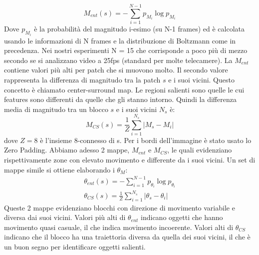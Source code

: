 \documentclass[12pt,twocolumn]{IEEEtran}
\begin{document}
			\begin{equation}
			M_{ent}(s) = -\sum_{i=1}^{N-1}p_{M_i}\log p_{M_i}
			\end{equation}
			Dove $p_{M_i}$ è la probabilità del magnitudo i-esimo (su N-1 frames) ed è calcolata usando le informazioni di N frames e la distribuzione di Boltzmann come in precedenza.\newline
			Nei nostri esperimenti N = 15 che corrisponde a poco più di mezzo secondo se si analizzano video a 25fps (standard per molte telecamere).\newline
			La $M_{ent}$ contiene valori più alti per patch che si muovono molto. Il secondo valore rappresenta la differenza di magnitudo tra la patch $s$ e i suoi vicini. Questo concetto è chiamato center-surround map. Le regioni salienti sono quelle le cui features sono differenti da quelle che gli stanno intorno. Quindi la differenza media di magnitudo tra un blocco $s$ e i suoi vicini $N_s$ è:
			\begin{equation}
			M_{CS}(s) = \frac{1}{Z} \sum_{i=1}^{N_s}|M_s-M_i|
			\end{equation}
			dove $Z = 8$ è l'insieme 8-connesso di s. Per i bordi dell'immagine è stato usato lo Zero Padding.\newline
			Abbiamo adesso 2 mappe, $M_{ent}$ e $M_{CS}$, le quali evidenziano rispettivamente zone con elevato movimento e differente da i suoi vicini.\newline
			Un set di mappe simile si ottiene elaborando i $\theta_M$:
			\begin{equation}
			\begin{aligned}
				\theta_{ent}(s) = -\sum_{i=1}^{N-1}p_{\theta_i}\log p_{\theta_i} \\
				\theta_{CS}(s) = \frac{1}{Z} \sum_{i=1}^{N_s}|\theta_s-\theta_i|
			\end{aligned}
			\end{equation}
			Queste 2 mappe evidenziano blocchi con direzione di movimento variabile e diversa dai suoi vicini. Valori più alti di $\theta_{ent}$ indicano oggetti che hanno movimento quasi casuale, il che indica movimento incoerente. Valori alti di $\theta_{CS}$ indicano che il blocco ha una traiettoria diversa da quella dei suoi vicini, il che è un buon segno per identificare oggetti salienti.
\end{document}
